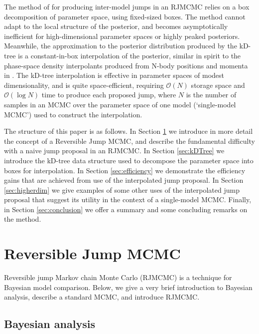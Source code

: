 \documentclass{rsos}
\newcommand{\order}[1]{\mathcal{O}\left( #1 \right)}
\begin{document}
The method of \cite{Littenberg2009} for producing inter-model jumps in
an RJMCMC relies on a box decomposition of parameter space, using
fixed-sized boxes.  The method cannot adapt to the local structure of
the posterior, and becomes asymptotically inefficient for
high-dimensional parameter spaces or highly peaked posteriors.
Meanwhile, the approximation to the posterior distribution produced by
the kD-tree is a constant-in-box interpolation of the posterior,
similar in spirit to the phase-space density interpolants produced
from N-body positions and momenta in \cite{Ascasibar2005}.  The
kD-tree interpolation is effective in parameter spaces of modest
dimensionality, and is quite space-efficient, requiring $\order{N}$
storage space and $\order{\log N}$ time to produce each proposed jump,
where $N$ is the number of samples in an MCMC over the parameter space of one model (`single-model MCMC') used to construct the interpolation.

The structure of this paper is as follows.  In Section
\ref{sec:reversible-jump} we introduce in more detail the concept of a
Reversible Jump MCMC, and describe the fundamental difficulty with a
naive jump proposal in an RJMCMC.  In Section \ref{sec:kDTree} we
introduce the kD-tree data structure used to decompose the parameter
space into boxes for interpolation.  In Section \ref{sec:efficiency}
we demonstrate the efficiency gains that are achieved from use of the
interpolated jump proposal.  In Section \ref{sec:higherdim} we give
examples of some other uses of the interpolated jump proposal that
suggest its utility in the context of a single-model MCMC.  Finally,
in Section \ref{sec:conclusion} we offer a summary and some concluding
remarks on the method.

\section{Reversible Jump MCMC}
\label{sec:reversible-jump}

Reversible jump Markov chain Monte Carlo (RJMCMC) \cite{Green1995} is
a technique for Bayesian model comparison.  Below, we give a very
brief introduction to Bayesian analysis, describe a standard MCMC, and
introduce RJMCMC.

\subsection{Bayesian analysis}
\end{document}
